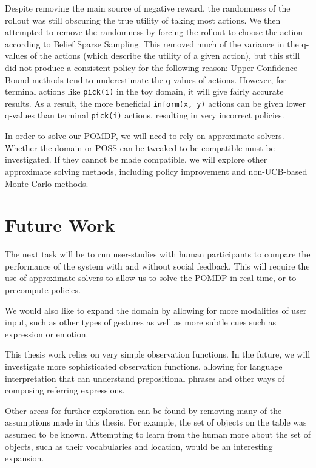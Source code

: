 \documentclass[conference]{IEEEtran}
\begin{document}
Despite removing the main source of negative reward, the randomness of the rollout was still obscuring the true utility of taking most actions. We then attempted to remove the randomness by forcing the rollout to choose the action according to Belief Sparse Sampling. This removed much of the variance in the q-values of the actions (which describe the utility of a given action), but this still did not produce a consistent policy for the following reason: Upper Confidence Bound methods tend to underestimate the q-values of actions. However, for terminal actions like \texttt{pick(i)} in the toy domain, it will give fairly accurate results. As a result, the more beneficial \texttt{inform(x, y)} actions can be given lower q-values than terminal \texttt{pick(i)} actions, resulting in very incorrect policies. 

In order to solve our POMDP, we will need to rely on approximate solvers. Whether the domain or POSS can be tweaked to be compatible must be investigated. If they cannot be made compatible, we will explore other approximate solving methods, including policy improvement and non-UCB-based Monte Carlo methods. 


\section{Future Work}

The next task will be to run user-studies with human participants to compare the performance of the system with and without social feedback. This will require the use of approximate solvers to allow us to solve the POMDP in real time, or to precompute policies. 

We would also like to expand the domain by allowing for more modalities of user input, such as other types of gestures as well as more subtle cues such as expression or emotion. 

This thesis work relies on very simple observation functions. In the future, we will investigate more sophisticated observation functions, allowing for language interpretation that can understand prepositional phrases and other ways of composing referring expressions. 

Other areas for further exploration can be found by removing many of the assumptions made in this thesis. For example, the set of objects on the table was assumed to be known. Attempting to learn from the human more about the set of objects, such as their vocabularies and location, would be an interesting expansion. 
\end{document}
